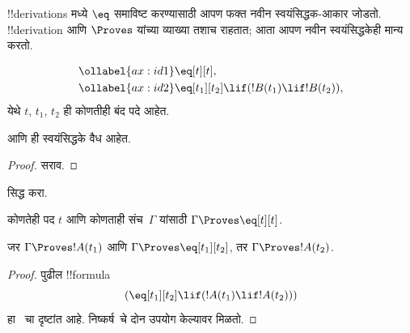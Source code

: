 \documentclass[../../../include/open-logic-section]{subfiles}
\begin{document}


!!{derivation}s मध्ये $\eq$ समाविष्ट करण्यासाठी आपण फक्त नवीन
स्वयंसिद्धक-आकार जोडतो. !!{derivation} आणि $\Proves$ यांच्या व्याख्या
तशाच राहतात; आता आपण नवीन स्वयंसिद्धकेही मान्य करतो.

\begin{defn}[!!{identity} साठीची स्वयंसिद्धके]
\begin{align}
\ollabel{ax:id1} & \eq[t][t], \\
\ollabel{ax:id2} & \eq[t_1][t_2] \lif (!B(t_1) \lif
  !B(t_2)),
\end{align}
येथे $t$, $t_1$, $t_2$ ही कोणतीही बंद पदे आहेत.
\end{defn}

\begin{prop}
   आणि  ही स्वयंसिद्धके वैध आहेत.
\end{prop}

\begin{proof}
  सराव.
\end{proof}

\begin{prob}
 सिद्ध करा.
\end{prob}

\begin{prop}
 कोणतेही पद $t$ आणि कोणताही संच~$\Gamma$ यांसाठी
 $\Gamma \Proves \eq[t][t]$.
\end{prop}

\begin{prop}
  जर $\Gamma \Proves !A(t_1)$ आणि $\Gamma \Proves
  \eq[t_1][t_2]$, तर $\Gamma \Proves !A(t_2)$.
\end{prop}

\begin{proof}
पुढील !!{formula}
\[
(\eq[t_1][t_2] \lif (!A(t_1) \lif !A(t_2)))
\]
हा~ चा दृष्टांत आहे. निष्कर्ष~\MP चे दोन उपयोग केल्यावर
मिळतो.
\end{proof}
\end{document}
